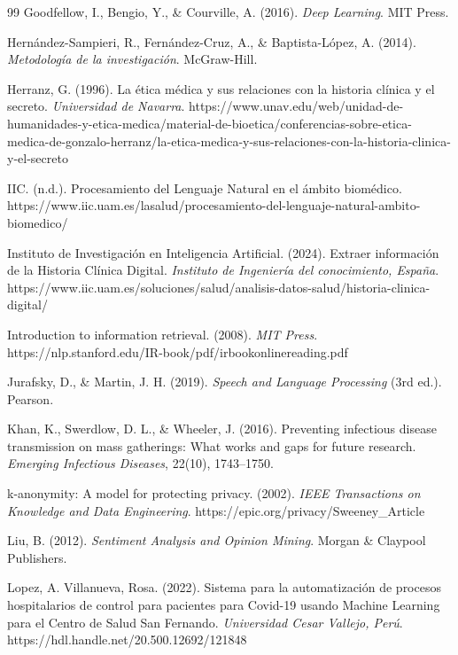 \documentclass[12pt,a4paper]{article}
\begin{document}
\begin{thebibliography}{99}
Goodfellow, I., Bengio, Y., \& Courville, A. (2016). \textit{Deep Learning}. MIT Press.

Hernández-Sampieri, R., Fernández-Cruz, A., \& Baptista-López, A. (2014). \textit{Metodología de la investigación}. McGraw-Hill.

Herranz, G. (1996). La ética médica y sus relaciones con la historia clínica y el secreto. \textit{Universidad de Navarra}. https://www.unav.edu/web/unidad-de-humanidades-y-etica-medica/material-de-bioetica/conferencias-sobre-etica-medica-de-gonzalo-herranz/la-etica-medica-y-sus-relaciones-con-la-historia-clinica-y-el-secreto

IIC. (n.d.). Procesamiento del Lenguaje Natural en el ámbito biomédico. https://www.iic.uam.es/lasalud/procesamiento-del-lenguaje-natural-ambito-biomedico/

Instituto de Investigación en Inteligencia Artificial. (2024). Extraer información de la Historia Clínica Digital. \textit{Instituto de Ingeniería del conocimiento, España}. https://www.iic.uam.es/soluciones/salud/analisis-datos-salud/historia-clinica-digital/

Introduction to information retrieval. (2008). \textit{MIT Press}. https://nlp.stanford.edu/IR-book/pdf/irbookonlinereading.pdf

Jurafsky, D., \& Martin, J. H. (2019). \textit{Speech and Language Processing} (3rd ed.). Pearson.

Khan, K., Swerdlow, D. L., \& Wheeler, J. (2016). Preventing infectious disease transmission on mass gatherings: What works and gaps for future research. \textit{Emerging Infectious Diseases}, 22(10), 1743–1750.

k-anonymity: A model for protecting privacy. (2002). \textit{IEEE Transactions on Knowledge and Data Engineering}. https://epic.org/privacy/Sweeney\_Article

Liu, B. (2012). \textit{Sentiment Analysis and Opinion Mining}. Morgan \& Claypool Publishers.

Lopez, A. Villanueva, Rosa. (2022). Sistema para la automatización de procesos hospitalarios de control para pacientes para Covid-19 usando Machine Learning para el Centro de Salud San Fernando. \textit{Universidad Cesar Vallejo, Perú}. https://hdl.handle.net/20.500.12692/121848


\end{thebibliography}
\end{document}

